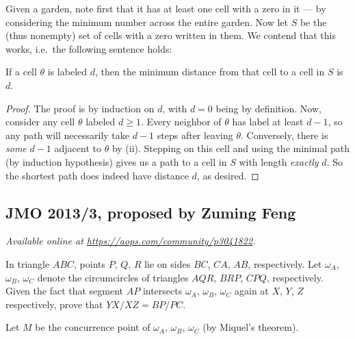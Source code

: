 \documentclass[11pt]{scrartcl}
\begin{document}
Given a garden, note first that it has at least
one cell with a zero in it --- by considering
the minimum number across the entire garden.
Now let $S$ be the (thus nonempty) set of
cells with a zero written in them.
We contend that this works, i.e.\ the following sentence holds:
\begin{claim*}
  If a cell $\theta$ is labeled $d$,
  then the minimum distance from that cell
  to a cell in $S$ is $d$.
\end{claim*}
\begin{proof}
  The proof is by induction on $d$, with $d = 0$ being by definition.
  Now, consider any cell $\theta$ labeled $d \ge 1$.
  Every neighbor of $\theta$ has label at least $d-1$,
  so any path will necessarily take $d-1$ steps after leaving $\theta$.
  Conversely, there is \emph{some} $d-1$ adjacent to $\theta$ by (ii).
  Stepping on this cell and using the minimal path
  (by induction hypothesis) gives us a path to
  a cell in $S$ with length \emph{exactly} $d$.
  So the shortest path does indeed have distance $d$, as desired.
\end{proof}
\pagebreak

\subsection{JMO 2013/3, proposed by Zuming Feng}
\textsl{Available online at \url{https://aops.com/community/p3041822}.}
\begin{mdframed}[style=mdpurplebox,frametitle={Problem statement}]
In triangle $ABC$,
points $P$, $Q$, $R$ lie on sides $BC$, $CA$, $AB$, respectively.
Let $\omega_A$, $\omega_B$, $\omega_C$ denote the
circumcircles of triangles $AQR$, $BRP$, $CPQ$, respectively.
Given the fact that segment $AP$ intersects
$\omega_A$, $\omega_B$, $\omega_C$ again at $X$, $Y$, $Z$ respectively,
prove that $YX/XZ=BP/PC$.
\end{mdframed}
Let $M$ be the concurrence point of
$\omega_A$, $\omega_B$, $\omega_C$
(by Miquel's theorem).
\end{document}
